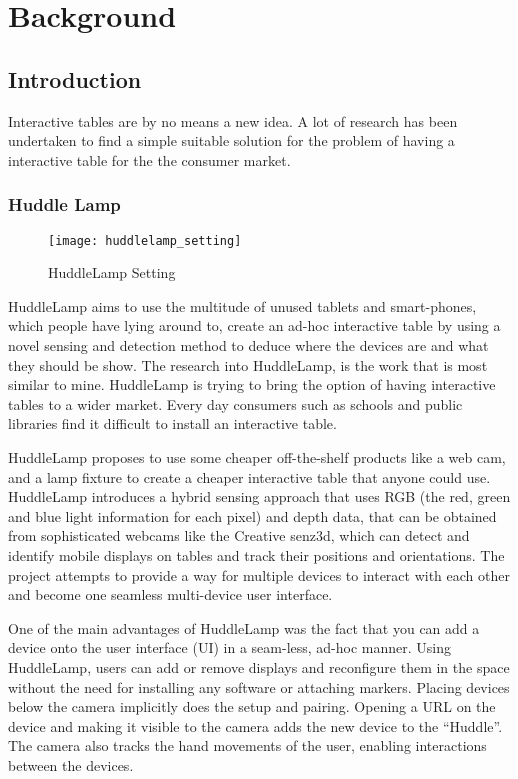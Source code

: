 
\chapter{Background}

\label{ch:background}

\section{Introduction} 

Interactive tables are by no means a new idea. A lot of research has
been undertaken to find a simple suitable solution for the problem of having a interactive table for the the consumer market.

\subsection{Huddle Lamp} \label{Sec:huddlelamp}
\begin{figure}[H]
\centering
\texttt{[image: huddlelamp\_setting]}
\protect\caption{HuddleLamp Setting}
\end{figure}
HuddleLamp aims to use the multitude of unused tablets and smart-phones,
which people have lying around to, create an ad-hoc interactive table
by using a novel sensing and detection method to deduce where the
devices are and what they should be show. The research into HuddleLamp\cite{huddle-link}, is the work that
is most similar to mine. HuddleLamp is trying to bring the option of having interactive tables to a wider market. Every day consumers such as schools and public libraries find it difficult to install an interactive table.


HuddleLamp\cite{huddlelamp-paper} proposes to use some cheaper
off-the-shelf products like a web cam, and a lamp fixture to create a cheaper
interactive table that anyone could use. HuddleLamp\cite{huddlelamp-paper} introduces a hybrid sensing approach that uses RGB (the red, green and blue light information for each pixel) and depth data, that can be obtained from sophisticated webcams like the Creative senz3d\cite{creative-senz3d}, which can detect and identify mobile displays on tables and track their positions and orientations. The project attempts to provide a way for multiple devices to interact with each other and become one seamless multi-device user interface.

One of the main advantages of HuddleLamp was the fact that you can add a device onto the user interface (UI) in a seam-less, ad-hoc manner. Using HuddleLamp,
users can add or remove displays and reconfigure them in the space without
the need for installing any software or attaching markers. Placing
devices below the camera implicitly does the setup and pairing.
Opening a URL on the device and making it visible to the camera adds
the new device to the \textquotedblleft Huddle\textquotedblright .
The camera also tracks the hand movements of the user, enabling interactions
between the devices.

